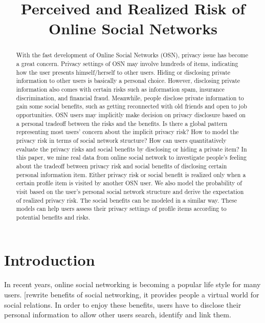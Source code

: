 \documentclass[a4paper]{article}
\begin{document}
\title{Perceived and Realized Risk of Online Social Networks}

\maketitle

\begin{abstract}
With the fast development of Online Social Networks (OSN), privacy
issue has become a great concern. Privacy settings of OSN may involve
hundreds of items, indicating how the user presents himself/herself to
other users. Hiding or disclosing private information to other users
is basically a personal choice. However, disclosing private
information also comes with certain risks such as information spam,
insurance discrimination, and financial fraud. Meanwhile, people
disclose private information to gain some social benefits, such as
getting reconnected with old friends and open to job
opportunities. OSN users may implicitly make decision on privacy
disclosure based on a personal tradeoff between the risks and the
benefits. Is there a global pattern representing most users’ concern
about the implicit privacy risk? How to model the privacy risk in
terms of social network structure? How can users quantitatively
evaluate the privacy risks and social benefits by disclosing or hiding
a private item? In this paper, we mine real data from online social
network to investigate people’s feeling about the tradeoff between
privacy risk and social benefits of disclosing certain personal
information item. Either privacy risk or social benefit is realized
only when a certain profile item is visited by another OSN user. We
also model the probability of visit based on the user’s personal
social network structure and derive the expectation of realized
privacy risk. The social benefits can be modeled in a similar
way. These models can help users assess their privacy settings of
profile items according to potential benefits and risks.

\end{abstract}

\section{Introduction}
In recent years, online social networking is becoming a popular life
style for many users. [rewrite benefits of social networking, it
provides people a virtual world for social relations. In order to
enjoy these benefits, users have to disclose their personal
information to allow other users search, identify and link them.
\end{document}
